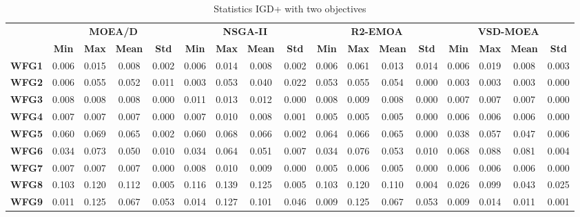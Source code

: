 \begin{table*}[t]
\centering
\caption{Statistics IGD+ with two objectives}
\label{tab:StatisticsIGDP_2obj}
\begin{tabular}{cc|c|c|c|c|c|c|c|c|c|c|c|c|c|c|c}
\cline{2-17}
 & \multicolumn{4}{c|}{\textbf{MOEA/D}} & \multicolumn{4}{c|}{\textbf{NSGA-II}} & \multicolumn{4}{c|}{\textbf{R2-EMOA}} & \multicolumn{4}{c}{\textbf{VSD-MOEA}} \\ \cline{2-17} 
 & \textbf{Min} & \textbf{Max} & \textbf{Mean} & \textbf{Std} & \textbf{Min} & \textbf{Max} & \textbf{Mean} & \textbf{Std} & \textbf{Min} & \textbf{Max} & \textbf{Mean} & \textbf{Std} & \textbf{Min} & \textbf{Max} & \textbf{Mean} & \textbf{Std} \\ \hline
\multicolumn{1}{c|}{\textbf{WFG1}} & 0.006 & 0.015 & 0.008 & 0.002 & 0.006 & 0.014 & 0.008 & 0.002 & 0.006 & 0.061 & 0.013 & 0.014 & 0.006 & 0.019 & 0.008 & 0.003 \\ \hline
\multicolumn{1}{c|}{\textbf{WFG2}} & 0.006 & 0.055 & 0.052 & 0.011 & 0.003 & 0.053 & 0.040 & 0.022 & 0.053 & 0.055 & 0.054 & 0.000 & 0.003 & 0.003 & 0.003 & 0.000 \\ \hline
\multicolumn{1}{c|}{\textbf{WFG3}} & 0.008 & 0.008 & 0.008 & 0.000 & 0.011 & 0.013 & 0.012 & 0.000 & 0.008 & 0.009 & 0.008 & 0.000 & 0.007 & 0.007 & 0.007 & 0.000 \\ \hline
\multicolumn{1}{c|}{\textbf{WFG4}} & 0.007 & 0.007 & 0.007 & 0.000 & 0.007 & 0.010 & 0.008 & 0.001 & 0.005 & 0.005 & 0.005 & 0.000 & 0.006 & 0.006 & 0.006 & 0.000 \\ \hline
\multicolumn{1}{c|}{\textbf{WFG5}} & 0.060 & 0.069 & 0.065 & 0.002 & 0.060 & 0.068 & 0.066 & 0.002 & 0.064 & 0.066 & 0.065 & 0.000 & 0.038 & 0.057 & 0.047 & 0.006 \\ \hline
\multicolumn{1}{c|}{\textbf{WFG6}} & 0.034 & 0.073 & 0.050 & 0.010 & 0.034 & 0.064 & 0.051 & 0.007 & 0.034 & 0.076 & 0.053 & 0.010 & 0.068 & 0.088 & 0.081 & 0.004 \\ \hline
\multicolumn{1}{c|}{\textbf{WFG7}} & 0.007 & 0.007 & 0.007 & 0.000 & 0.008 & 0.010 & 0.009 & 0.000 & 0.005 & 0.006 & 0.005 & 0.000 & 0.006 & 0.006 & 0.006 & 0.000 \\ \hline
\multicolumn{1}{c|}{\textbf{WFG8}} & 0.103 & 0.120 & 0.112 & 0.005 & 0.116 & 0.139 & 0.125 & 0.005 & 0.103 & 0.120 & 0.110 & 0.004 & 0.026 & 0.099 & 0.043 & 0.025 \\ \hline
\multicolumn{1}{c|}{\textbf{WFG9}} & 0.011 & 0.125 & 0.067 & 0.053 & 0.014 & 0.127 & 0.101 & 0.046 & 0.009 & 0.125 & 0.067 & 0.053 & 0.009 & 0.014 & 0.011 & 0.001 \\ \hline

\end{tabular}
\end{table*}
